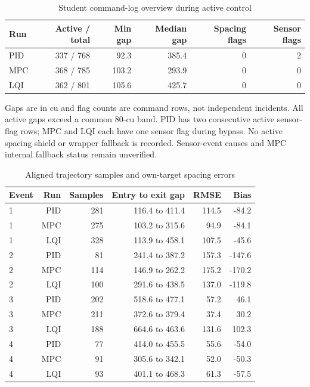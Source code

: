 \documentclass[11pt,a4paper]{article}
\begin{document}
\begin{table}[H]\centering\small\caption{Student command-log overview during active control}
\begin{tabular}{lrrrrr}
\toprule
Run & Active / total & Min gap & Median gap & Spacing flags & Sensor flags \\
\midrule

PID & 337 / 768 & 92.3 & 385.4 & 0 & 2 \\

MPC & 368 / 785 & 103.2 & 293.9 & 0 & 0 \\

LQI & 362 / 801 & 105.6 & 425.7 & 0 & 0 \\

\bottomrule\end{tabular}\end{table}

Gaps are in cu and flag counts are command rows, not independent incidents. All active gaps exceed a common 80-cu band. PID has two consecutive active sensor-flag rows; MPC and LQI each have one sensor flag during bypass. No active spacing shield or wrapper fallback is recorded. Sensor-event causes and MPC internal fallback status remain unverified.


\begin{table}[H]\centering\small\caption{Aligned trajectory samples and own-target spacing errors}
\begin{tabular}{lrrrrr}
\toprule
Event & Run & Samples & Entry to exit gap & RMSE & Bias \\
\midrule

1 & PID & 281 & 116.4 to 411.4 & 114.5 & -84.2 \\

1 & MPC & 275 & 103.2 to 315.6 & 94.9 & -84.1 \\

1 & LQI & 328 & 113.9 to 458.1 & 107.5 & -45.6 \\

2 & PID & 81 & 241.4 to 387.2 & 157.3 & -147.6 \\

2 & MPC & 114 & 146.9 to 262.2 & 175.2 & -170.2 \\

2 & LQI & 100 & 291.6 to 438.5 & 137.0 & -119.8 \\

3 & PID & 202 & 518.6 to 477.1 & 57.2 & 46.1 \\

3 & MPC & 211 & 372.6 to 379.4 & 37.4 & 30.2 \\

3 & LQI & 188 & 664.6 to 463.6 & 131.6 & 102.3 \\

4 & PID & 77 & 414.0 to 455.5 & 55.6 & -54.0 \\

4 & MPC & 91 & 305.6 to 342.1 & 52.0 & -50.3 \\

4 & LQI & 93 & 401.1 to 468.3 & 61.3 & -57.5 \\

\bottomrule\end{tabular}\end{table}
\end{document}
